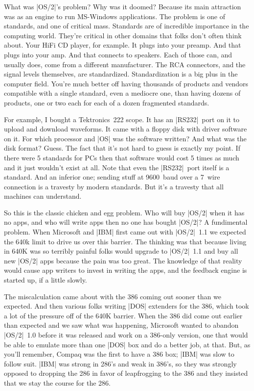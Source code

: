 What was |OS/2|'s problem?  Why was it doomed?  Because its main attraction
was as an engine to run MS-Windows applications.  The problem is one of
standards, and one of critical mass.  Standards are of incredible importance
in the computing world.  They're critical in other domains that folks
don't often think about.  Your HiFi CD player, for example.  It plugs into
your preamp.  And that plugs into your amp.  And that connects to speakers.
Each of those can, and usually does, come from a different manufacturer.
The RCA connectors, and the signal levels themselves, are standardized.
Standardization is a big plus in the computer field.  You're much better off
having thousands of products and vendors compatible with a single standard,
even a mediocre one, than having dozens of products, one or two each for
each of a dozen fragmented standards.

For example, I bought a Tektronics~222 scope.  It has an |RS232|~port on
it to upload and download waveforms.  It came with a floppy disk with
driver software on it.  For which processor and |OS| was the software written?
And what was the disk format?  Guess.  The fact that it's not hard to
guess is exactly my point.  If there were 5 standards for PCs then
that software would cost 5 times as much and it just wouldn't exist at all.  
Note that even the |RS232|~port
itself is a standard.  And an inferior one; sending stuff at 9600~baud
over a 7~wire connection is a travesty by modern standards.  But it's
a travesty that all machines can understand.

So this is the classic chicken and egg problem.  Who will buy |OS/2| when
it has no apps, and who will write apps then no one has bought |OS/2|?
A fundimental problem.  When Microsoft and |IBM| first came out with |OS/2|~1.1
we expected the 640k limit to drive us over this barrier.  The thinking
was that because living in 640K was so terribly painful folks would
upgrade to |OS/2|~1.1 and buy all new |OS/2| apps because the pain was too
great.  The knowledge of that reality would cause app writers to
invest in writing the apps, and the feedback engine is started up, if
a little slowly.  

The miscalculation came about with the 386 coming out sooner than we
expected.  And then various folks writing |DOS| extenders for the 386,
which took a lot of the pressure off of the 640K barrier.  When the
386 did come out earlier than expected and we saw what was happening, 
Microsoft wanted to abandon
|OS/2|~1.0 before it was released and work on a 386-only version, one that
would be able to emulate more than one |DOS| box and do a better job, at that.
But, as you'll remember, Compaq was the first to have a 386 box; |IBM|
was slow to follow suit.  |IBM| was strong in 286's and weak in 386's,
so they was strongly opposed to dropping the 286
in favor of leapfrogging to the 386 and they insisted that we stay the course
for the 286.  

